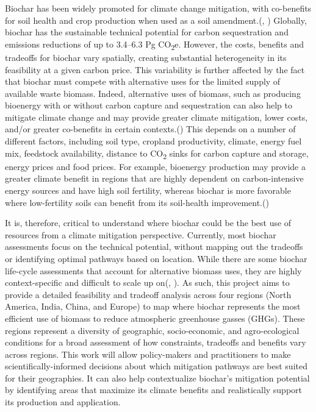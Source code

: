 \documentclass[
  letterpaper,
]{article}
\begin{document}
Biochar has been widely promoted for climate change mitigation, with
co-benefits for soil health and crop production when used as a soil
amendment.(,
) Globally, biochar has the
sustainable technical potential for carbon sequestration and emissions
reductions of up to 3.4--6.3 Pg CO\textsubscript{2}e. However, the
costs, benefits and tradeoffs for biochar vary spatially, creating
substantial heterogeneity in its feasibility at a given carbon price.
This variability is further affected by the fact that biochar must
compete with alternative uses for the limited supply of available waste
biomass. Indeed, alternative uses of biomass, such as producing
bioenergy with or without carbon capture and sequestration can also help
to mitigate climate change and may provide greater climate mitigation,
lower costs, and/or greater co-benefits in certain
contexts.() This depends on a number
of different factors, including soil type, cropland productivity,
climate, energy fuel mix, feedstock availability, distance to
CO\textsubscript{2} sinks for carbon capture and storage, energy prices
and food prices. For example, bioenergy production may provide a greater
climate benefit in regions that are highly dependent on carbon-intensive
energy sources and have high soil fertility, whereas biochar is more
favorable where low-fertility soils can benefit from its soil-health
improvement.()

It is, therefore, critical to understand where biochar could be the best
use of resources from a climate mitigation perspective. Currently, most
biochar assessments focus on the technical potential, without mapping
out the tradeoffs or identifying optimal pathways based on location.
While there are some biochar life-cycle assessments that account for
alternative biomass uses, they are highly context-specific and difficult
to scale up on(,
). As such, this project aims to
provide a detailed feasibility and tradeoff analysis across four regions
(North America, India, China, and Europe) to map where biochar
represents the most efficient use of biomass to reduce atmospheric
greenhouse gasses (GHGs). These regions represent a diversity of
geographic, socio-economic, and agro-ecological conditions for a broad
assessment of how constraints, tradeoffs and benefits vary across
regions. This work will allow policy-makers and practitioners to make
scientifically-informed decisions about which mitigation pathways are
best suited for their geographies. It can also help contextualize
biochar's mitigation potential by identifying areas that maximize its
climate benefits and realistically support its production and
application.
\end{document}
